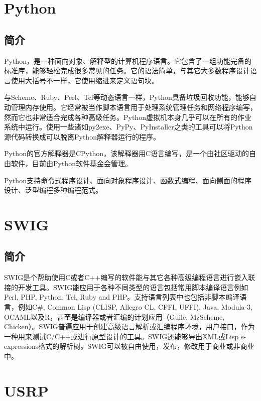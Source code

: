 \section{Python}
	\subsection{简介}
	\par Python，是一种面向对象、解释型的计算机程序语言。它包含了一组功能完备的标准库，能够轻松完成很多常见的任务。它的语法简单，与其它大多数程序设计语言使用大括号不一样，它使用缩进来定义语句块。
	\par 与Scheme、Ruby、Perl、Tcl等动态语言一样，Python具备垃圾回收功能，能够自动管理内存使用。它经常被当作脚本语言用于处理系统管理任务和网络程序编写，然而它也非常适合完成各种高级任务。Python虚拟机本身几乎可以在所有的作业系统中运行。使用一些诸如py2exe、PyPy、PyInstaller之类的工具可以将Python源代码转换成可以脱离Python解释器运行的程序。
	\par Python的官方解释器是CPython，该解释器用C语言编写，是一个由社区驱动的自由软件，目前由Python软件基金会管理。
	\par Python支持命令式程序设计、面向对象程序设计、函数式编程、面向侧面的程序设计、泛型编程多种编程范式。\cite{ wiki:Python}
\section{SWIG}
	\subsection{简介}
	\par SWIG是个帮助使用C或者C++编写的软件能与其它各种高级编程语言进行嵌入联接的开发工具。SWIG能应用于各种不同类型的语言包括常用脚本编译语言例如Perl, PHP, Python, Tcl, Ruby and PHP。支持语言列表中也包括非脚本编译语言，例如C\#, Common Lisp (CLISP, Allegro CL, CFFI, UFFI), Java, Modula-3, OCAML以及R，甚至是编译器或者汇编的计划应用（Guile, MzScheme, Chicken）。SWIG普遍应用于创建高级语言解析或汇编程序环境，用户接口，作为一种用来测试C/C++或进行原型设计的工具。SWIG还能够导出XML或Lisp s-expressions格式的解析树。SWIG可以被自由使用，发布，修改用于商业或非商业中。\cite{ wiki:SWIG}
\section{USRP}
